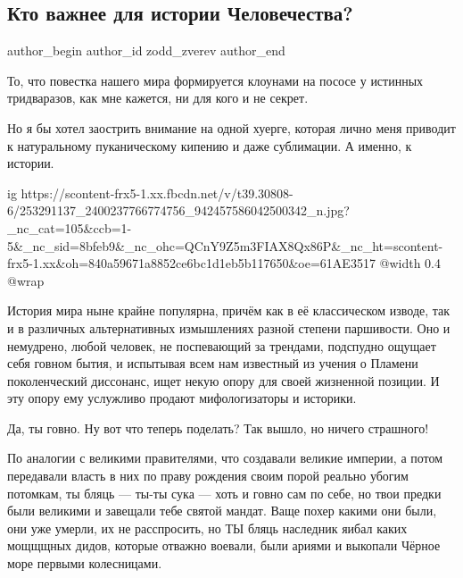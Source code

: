  
 
 
 
 
 
\subsection{Кто важнее для истории Человечества?}
\label{sec:07_11_2021.fb.zodd_zverev.1.humanity_kto_vazhnee}
 
\ifcmt
 author_begin
   author_id zodd_zverev
 author_end
\fi

То, что повестка нашего мира формируется клоунами на пососе у истинных
тридваразов, как мне кажется, ни для кого и не секрет.

Но я бы хотел заострить внимание на одной хуерге, которая лично меня приводит к
натуральному пуканическому кипению и даже сублимации. А именно, к истории.

\ifcmt
  ig https://scontent-frx5-1.xx.fbcdn.net/v/t39.30808-6/253291137_2400237766774756_942457586042500342_n.jpg?_nc_cat=105&ccb=1-5&_nc_sid=8bfeb9&_nc_ohc=QCnY9Z5m3FIAX8Qx86P&_nc_ht=scontent-frx5-1.xx&oh=840a59671a8852ce6bc1d1eb5b117650&oe=61AE3517
  @width 0.4
  @wrap 
\fi

История мира ныне крайне популярна, причём как в её классическом изводе, так и
в различных альтернативных измышлениях разной степени паршивости. Оно и
немудрено, любой человек, не поспевающий за трендами, подспудно ощущает себя
говном бытия, и испытывая всем нам известный из учения о Пламени поколенческий
диссонанс, ищет некую опору для своей жизненной позиции. И эту опору ему
услужливо продают мифологизаторы и историки.

Да, ты говно. Ну вот что теперь поделать? Так вышло, но ничего страшного! 

По аналогии с великими правителями, что создавали великие империи, а потом
передавали власть в них по праву рождения своим порой реально убогим потомкам,
ты бляць — ты-ты сука — хоть и говно сам по себе, но твои предки были великими
и завещали тебе святой мандат. Ваще похер какими они были, они уже умерли, их
не расспросить, но ТЫ бляць наследник яибал каких мощщщных дидов, которые
отважно воевали, были ариями и выкопали Чёрное море первыми колесницами.

